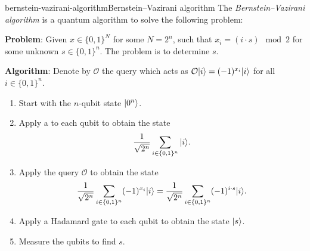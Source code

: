 \begin{topic}{bernstein-vazirani-algorithm}{Bernstein--Vazirani algorithm}
    The \emph{Bernstein--Vazirani algorithm} is a quantum algorithm to solve the following problem:
    
    \textbf{Problem}: Given $x \in \{ 0, 1 \}^N$ for some $N = 2^n$, such that $x_i = (i \cdot s) \mod 2$ for some unknown $s \in \{ 0, 1 \}^n$. The problem is to determine $s$.

    \textbf{Algorithm}: Denote by $\mathcal{O}$ the query which acts as $\mathcal{O} |i\rangle = (-1)^{x_i} |i\rangle$ for all $i \in \{ 0, 1 \}^n$.
    \begin{enumerate}[label=(\arabic*)]
        \item Start with the $n$-qubit state $|0^n\rangle$.
        \item Apply a  to each qubit to obtain the state
        \[ \frac{1}{\sqrt{2^n}} \sum_{i \in \{ 0, 1 \}^n } |i\rangle . \]
        \item Apply the query $\mathcal{O}$ to obtain the state
        \[ \frac{1}{\sqrt{2^n}} \sum_{i \in \{ 0, 1 \}^n} (-1)^{x_i} |i\rangle = \frac{1}{\sqrt{2^n}} \sum_{i \in \{ 0, 1 \}^n} (-1)^{i \cdot s} |i\rangle . \]
        \item Apply a Hadamard gate to each qubit to obtain the state $|s\rangle$.
        \item Measure the qubits to find $s$.
    \end{enumerate}
\end{topic}

